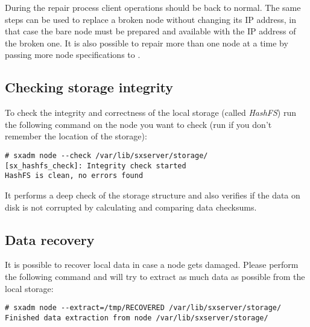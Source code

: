 During the repair process client operations should be back to normal. The same
steps can be used to replace a broken node without changing its IP address, in
that case the bare node must be prepared and available with the IP address of
the broken one. It is also possible to repair more than one node at a time by
passing more node specifications to .

\subsection{Checking storage integrity}
To check the integrity and correctness of the local storage (called
\textsl{HashFS}) run the following command on the node you want to check (run
 if you don't remember the location of the storage):
\begin{lstlisting}
# sxadm node --check /var/lib/sxserver/storage/
[sx_hashfs_check]: Integrity check started   
HashFS is clean, no errors found
\end{lstlisting}
It performs a deep check of the storage structure and also verifies if the
data on disk is not corrupted by calculating and comparing data checksums.

\subsection{Data recovery}
It is possible to recover local data in case a node gets damaged. Please
perform the following command and  will try to extract as
much data as possible from the local storage:
\begin{lstlisting}
# sxadm node --extract=/tmp/RECOVERED /var/lib/sxserver/storage/
Finished data extraction from node /var/lib/sxserver/storage/
\end{lstlisting}

